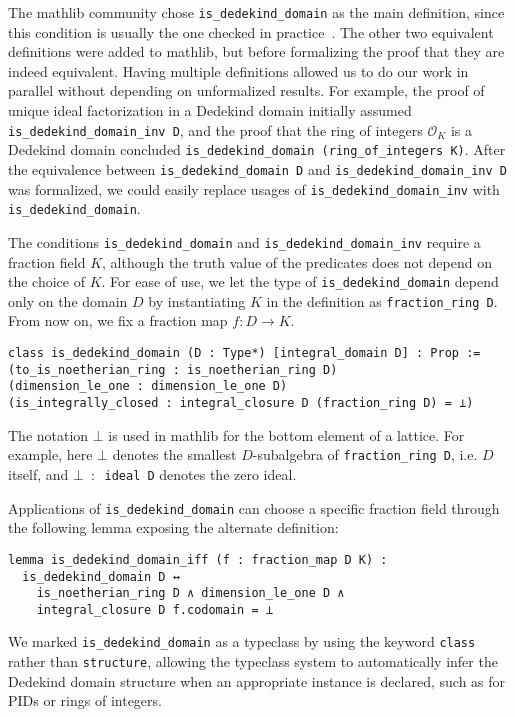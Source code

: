 \documentclass[a4paper,USenglish,cleveref, autoref, thm-restate]{lipics-v2021}
\newcommand{\lean}[1]{\texttt{#1}\xspace}
\newcommand*{\OK}[1][K]{\mathcal{O}_{#1}}
\newcommand{\mathlib}{\textsf{mathlib}\xspace}
\begin{document}
The mathlib community chose \lean{is\_dedekind\_domain} as the main definition,
since this condition is usually the one checked in practice~\cite{Neukirch}.
The other two equivalent definitions were added to \mathlib, but before formalizing the proof that they are indeed equivalent.
Having multiple definitions allowed us to do our work in parallel without depending on unformalized results.
For example,
the proof of unique ideal factorization in a Dedekind domain initially assumed \lean{is\_dedekind\_domain\_inv D},
and the proof that the ring of integers $\OK$ is a Dedekind domain concluded \lean{is\_dedekind\_domain (ring\_of\_integers K)}.
After the equivalence between \lean{is\_dedekind\_domain D} and \lean{is\_dedekind\_domain\_inv D} was formalized,
we could easily replace usages of \lean{is\_dedekind\_domain\_inv} with \lean{is\_dedekind\_domain}.

The conditions \lean{is\_dedekind\_domain} and \lean{is\_dedekind\_domain\_inv} require a fraction field $K$,
although the truth value of the predicates does not depend on the choice of $K$.
For ease of use, we let the type of \lean{is\_dedekind\_domain} depend only on the domain $D$
by instantiating $K$ in the definition as \lean{fraction\_ring D}. From now on, we fix a fraction map $f\colon D\to K$.
\begin{lstlisting}
class is_dedekind_domain (D : Type*) [integral_domain D] : Prop :=
(to_is_noetherian_ring : is_noetherian_ring D)
(dimension_le_one : dimension_le_one D)
(is_integrally_closed : integral_closure D (fraction_ring D) = ⊥)
\end{lstlisting}
The notation $\bot$ is used in \mathlib for the bottom element of a lattice.
For example, here $\bot$ denotes the smallest $D$-subalgebra of \lean{fraction\_ring D}, i.e. $D$ itself,
and \lean{$\bot$ $:$ ideal D} denotes the zero ideal.

Applications of \lean{is\_dedekind\_domain} can choose a specific fraction field through the following lemma exposing the alternate definition:
\begin{lstlisting}
lemma is_dedekind_domain_iff (f : fraction_map D K) :
  is_dedekind_domain D ↔
    is_noetherian_ring D ∧ dimension_le_one D ∧
    integral_closure D f.codomain = ⊥
\end{lstlisting}

We marked \lean{is\_dedekind\_domain} as a typeclass by using the keyword \lean{class} rather than \lean{structure},
allowing the typeclass system to automatically infer the Dedekind domain structure when an appropriate instance is declared, such as for PIDs or rings of integers.
\end{document}
